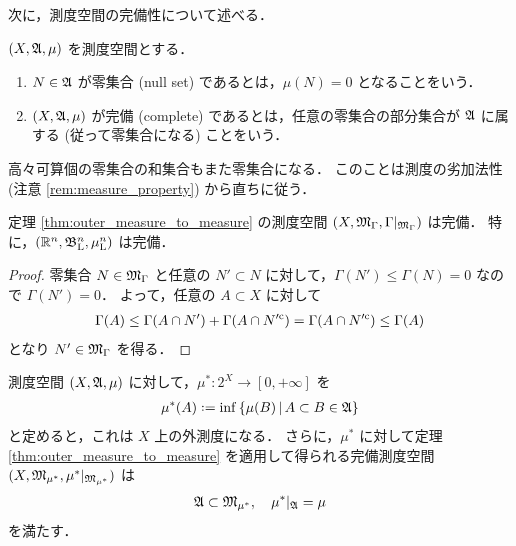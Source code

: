 次に，測度空間の完備性について述べる．

\begin{definition}
    $(X,\mathfrak{A},\mu)$ を測度空間とする．
    \begin{enumerate}
        \item $N\in\mathfrak{A}$ が零集合 (null set) であるとは，$\mu(N)=0$ となることをいう．
        \item $(X,\mathfrak{A},\mu)$ が完備 (complete) であるとは，任意の零集合の部分集合が $\mathfrak{A}$ に属する (従って零集合になる) ことをいう．
    \end{enumerate}
\end{definition}

\begin{remark}\label{rem:null_set_countable}
    高々可算個の零集合の和集合もまた零集合になる．
    このことは測度の劣加法性 (注意 \ref{rem:measure_property}) から直ちに従う．
\end{remark}

\begin{proposition}
    定理 \ref{thm:outer_measure_to_measure} の測度空間 $(X,\mathfrak{M}_\Gamma,\Gamma\vert_{\mathfrak{M}_\Gamma})$ は完備．
    特に，$(\mathbb{R}^n,\mathfrak{B}_{\mathrm{L}}^n,\mu_{\mathrm{L}}^n)$ は完備．
\end{proposition}

\begin{proof}
    零集合 $N\in\mathfrak{M}_\Gamma$ と任意の $N'\subset N$ に対して，$\Gamma(N')\le\Gamma(N)=0$ なので $\Gamma(N')=0$．
    よって，任意の $A\subset X$ に対して
    \begin{align*}
        \Gamma(A)
        \le\Gamma(A\cap N')+\Gamma(A\cap N'^{\mathrm{c}})
        =\Gamma(A\cap N'^{\mathrm{c}})
        \le\Gamma(A)
    \end{align*}
    となり $N'\in\mathfrak{M}_\Gamma$ を得る．
\end{proof}

\begin{theorem}\label{thm:measure_completion}
    測度空間 $(X,\mathfrak{A},\mu)$ に対して，$\mu^\ast:2^X\to[0,+\infty]$ を
    \begin{align*}
        \mu^\ast(A)\defeq\inf\left\{
            \mu(B)\,\middle\vert\,A\subset B\in\Afrak
        \right\}
    \end{align*}
    と定めると，これは $X$ 上の外測度になる．
    さらに，$\mu^\ast$ に対して定理 \ref{thm:outer_measure_to_measure} を適用して得られる完備測度空間
    $(X,\mathfrak{M}_{\mu^*},\mu^\ast\vert_{\mathfrak{M}_{\mu^\ast}})$ は
    \begin{align*}
        \mathfrak{A}\subset\mathfrak{M}_{\mu^*},\quad
        \mu^\ast\vert_{\mathfrak{A}}=\mu
    \end{align*}
    を満たす．
\end{theorem}

